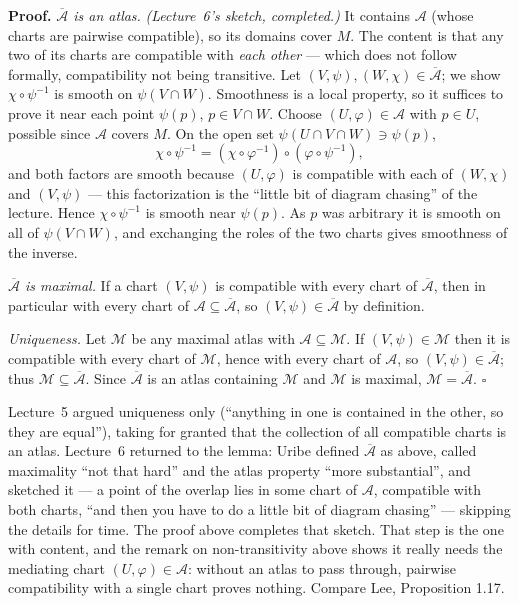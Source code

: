 \documentclass[11pt]{report}
\renewenvironment{proof}[1][Proof]{\noindent\textbf{#1.} }{\hfill$\square$\par\vspace{5pt}}
\begin{document}
\begin{proof}
\emph{$\overline{\mathcal{A}}$ is an atlas.} \textit{(Lecture~6's sketch, completed.)} It contains $\mathcal{A}$ (whose charts are pairwise compatible), so its domains cover $M$. The content is that any two of its charts are compatible with \emph{each other} --- which does not follow formally, compatibility not being transitive. Let $(V,\psi), (W,\chi) \in \overline{\mathcal{A}}$; we show $\chi \circ \psi^{-1}$ is smooth on $\psi(V \cap W)$. Smoothness is a local property, so it suffices to prove it near each point $\psi(p)$, $p \in V \cap W$. Choose $(U,\varphi) \in \mathcal{A}$ with $p \in U$, possible since $\mathcal{A}$ covers $M$. On the open set $\psi(U \cap V \cap W) \ni \psi(p)$,
\[
\chi \circ \psi^{-1} = (\chi \circ \varphi^{-1}) \circ (\varphi \circ \psi^{-1}),
\]
and both factors are smooth because $(U,\varphi)$ is compatible with each of $(W,\chi)$ and $(V,\psi)$ --- this factorization is the ``little bit of diagram chasing'' of the lecture. Hence $\chi \circ \psi^{-1}$ is smooth near $\psi(p)$. As $p$ was arbitrary it is smooth on all of $\psi(V\cap W)$, and exchanging the roles of the two charts gives smoothness of the inverse.

\emph{$\overline{\mathcal{A}}$ is maximal.} If a chart $(V,\psi)$ is compatible with every chart of $\overline{\mathcal{A}}$, then in particular with every chart of $\mathcal{A} \subseteq \overline{\mathcal{A}}$, so $(V,\psi) \in \overline{\mathcal{A}}$ by definition.

\emph{Uniqueness.} Let $\mathcal{M}$ be any maximal atlas with $\mathcal{A} \subseteq \mathcal{M}$. If $(V,\psi) \in \mathcal{M}$ then it is compatible with every chart of $\mathcal{M}$, hence with every chart of $\mathcal{A}$, so $(V,\psi) \in \overline{\mathcal{A}}$; thus $\mathcal{M} \subseteq \overline{\mathcal{A}}$. Since $\overline{\mathcal{A}}$ is an atlas containing $\mathcal{M}$ and $\mathcal{M}$ is maximal, $\mathcal{M} = \overline{\mathcal{A}}$.
\end{proof}

Lecture~5 argued uniqueness only (``anything in one is contained in the other, so they are equal''), taking for granted that the collection of all compatible charts is an atlas. Lecture~6 returned to the lemma: Uribe defined $\overline{\mathcal{A}}$ as above, called maximality ``not that hard'' and the atlas property ``more substantial'', and sketched it --- a point of the overlap lies in some chart of $\mathcal{A}$, compatible with both charts, ``and then you have to do a little bit of diagram chasing'' --- skipping the details for time. The proof above completes that sketch. That step is the one with content, and the remark on non-transitivity above shows it really needs the mediating chart $(U,\varphi) \in \mathcal{A}$: without an atlas to pass through, pairwise compatibility with a single chart proves nothing. Compare Lee, Proposition 1.17.
\end{document}
